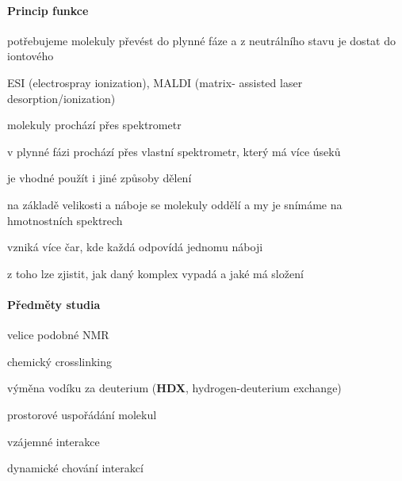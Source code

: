 \documentclass[DIV=8]{scrreprt}
\begin{document}
\paragraph{Princip funkce}
\begin{myItemize}[nosep]
    \item potřebujeme molekuly převést do plynné fáze a z neutrálního stavu je dostat do iontového
\begin{myItemize}[nosep]
    \item ESI (electrospray ionization), MALDI (matrix- assisted laser desorption/ionization)
\end{myItemize}

    \item molekuly prochází přes spektrometr
\begin{myItemize}[nosep]
    \item v plynné fázi prochází přes vlastní spektrometr, který má více úseků
    \item je vhodné použít i jiné způsoby dělení
\end{myItemize}

    \item na základě velikosti a náboje se molekuly oddělí a my je snímáme na hmotnostních spektrech
\begin{myItemize}[nosep]
    \item vzniká více čar, kde každá odpovídá jednomu náboji
    \item z toho lze zjistit, jak daný komplex vypadá a jaké má složení
\end{myItemize}

\end{myItemize}



\paragraph{Předměty studia}
\begin{myItemize}[nosep]
    \item velice podobné NMR
    \item chemický crosslinking
    \item výměna vodíku za deuterium (\textbf{HDX}, hydrogen-deuterium exchange)
    \item prostorové uspořádání molekul
    \item vzájemné interakce
    \item dynamické chování interakcí
\end{myItemize}
\end{document}
